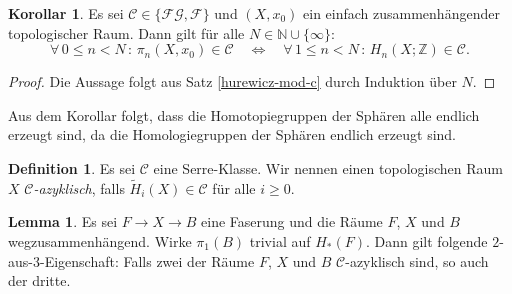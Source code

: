 \documentclass[11pt, a4paper, german]{article}
\theoremstyle{definition}
\newtheorem{lem}{Lemma}
\newtheorem{defn}{Definition}
\newtheorem{kor}{Korollar}
\theoremstyle{remark}
\newcommand{\N}{\mathbb{N}} %
\newcommand{\Z}{\mathbb{Z}} %
\newcommand{\fa}[1]{\forall \, {#1} \,:\,}
\newcommand{\SC}{\mathcal{C}} %
\newcommand{\FG}{\mathcal{FG}} %
\newcommand{\F}{\mathcal{F}} %
\begin{document}
\begin{kor}\label{homotopy-in-c-iff-homology-in-c}
  Es sei $\SC \in \{ \FG, \F \}$ und
  $(X, x_0)$ ein einfach zusammenhängender topologischer Raum.
  Dann gilt für alle $N \in \N \cup \{ \infty \}$:
  \[
    \fa{0 \leq n < N} \pi_n(X, x_0) \in \SC
    \quad \iff \quad
    \fa{1 \leq n < N} H_n(X; \Z) \in \SC.
  \]
\end{kor}

\begin{proof}
  Die Aussage folgt aus Satz \ref{hurewicz-mod-c} durch Induktion über $N$.
\end{proof}

Aus dem Korollar folgt, dass die Homotopiegruppen der Sphären alle endlich erzeugt sind, da die Homologiegruppen der Sphären endlich erzeugt sind.

\begin{defn}
  Es sei $\SC$ eine Serre-Klasse.
  Wir nennen einen topologischen Raum~$X$ \emph{$\SC$-azyklisch}, falls $\widetilde{H}_i(X) \in \SC$ für alle $i \geq 0$.
\end{defn}

\begin{lem}\label{two-of-three}
  Es sei $F \to X \to B$ eine Faserung und die Räume $F$, $X$ und $B$ wegzusammenhängend.
  Wirke $\pi_1(B)$ trivial auf $H_*(F)$.
  Dann gilt folgende $2$-aus-$3$-Eigenschaft: Falls zwei der Räume $F$, $X$ und $B$ $\SC$-azyklisch sind, so auch der dritte.
\end{lem}
\end{document}
